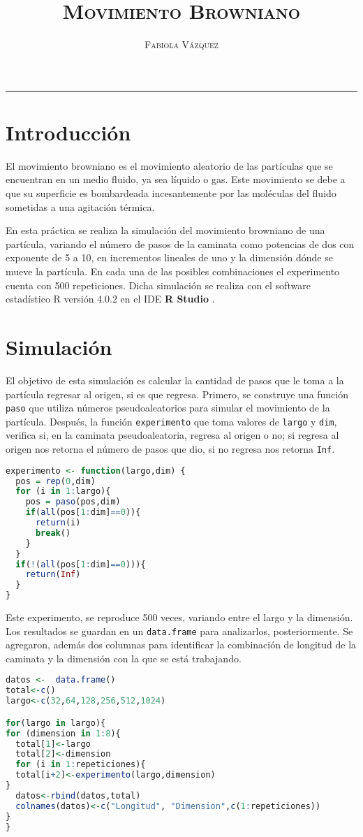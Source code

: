 \documentclass[12pt,letterpaper]{article}
\title{\textsc{Movimiento Browniano}}
\author{\textsc{Fabiola Vázquez}}
\begin{document}
\maketitle
\hrule
\section{Introducción}
El movimiento browniano es el movimiento aleatorio de las partículas que se encuentran en un medio fluido, ya sea líquido o gas. Este movimiento se debe a que su superficie es   bombardeada incesantemente por las moléculas del fluido sometidas a una agitación térmica.

En esta práctica se realiza la simulación del movimiento browniano de una partícula, variando el número de pasos de la caminata como potencias de dos con exponente de 5 a 10, en incrementos lineales de uno y la dimensión dónde se mueve la partícula. En cada una de las posibles combinaciones el experimento cuenta con 500 repeticiones. Dicha simulación se realiza con el software estadístico R versión 4.0.2 \cite{R} en el IDE \textbf{R Studio} \cite{rstudio}.  

\section{Simulación}
El objetivo de esta simulación es calcular la cantidad de pasos que le toma a la partícula regresar al origen, si es que regresa. Primero, se construye una función \texttt{paso} que utiliza números pseudoaleatorios para simular el movimiento de la partícula. Después, la función \texttt{experimento} que toma valores de \texttt{largo} y \texttt{dim}, verifica si, en la caminata pseudoaleatoria, regresa al origen o no; si regresa al origen nos retorna el número de pasos que dio, si no regresa nos retorna \texttt{Inf}. 

\begin{lstlisting}[language=R]
experimento <- function(largo,dim) {
  pos = rep(0,dim)
  for (i in 1:largo){
    pos = paso(pos,dim)
    if(all(pos[1:dim]==0)){
      return(i)
      break()
    }
  }
  if(!(all(pos[1:dim]==0))){
    return(Inf)
  }
}
\end{lstlisting}
Este experimento, se reproduce 500 veces, variando entre el largo y la dimensión. Los resultados se guardan en un \texttt{data.frame} para analizarlos, posteriormente. Se agregaron, además dos columnas para identificar la combinación  de longitud de la caminata y la dimensión con la que se está trabajando.
\begin{lstlisting}[language=R]
datos <-  data.frame()
total<-c()
largo<-c(32,64,128,256,512,1024)

for(largo in largo){
for (dimension in 1:8){
  total[1]<-largo
  total[2]<-dimension
  for (i in 1:repeticiones){
  total[i+2]<-experimento(largo,dimension)
}
  datos<-rbind(datos,total)
  colnames(datos)<-c("Longitud", "Dimension",c(1:repeticiones))
}
}
\end{lstlisting}
\end{document}
